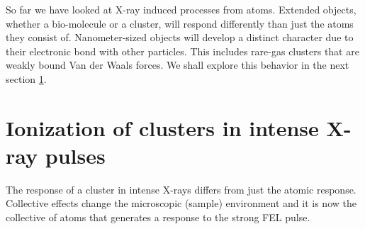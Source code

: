 So far we have looked at X-ray induced processes from atoms. Extended objects, whether a bio-molecule or a cluster, will respond differently than just the atoms they consist of. Nanometer-sized objects will develop a distinct character due to their electronic bond with other particles. This includes rare-gas clusters that are weakly bound Van der Waals forces. We shall explore this behavior in the next section \ref{sec:ionizatin-of-ext-obj}.
%
%
%
%
\section{Ionization of clusters in intense X-ray pulses}\label{sec:ionizatin-of-ext-obj}
The response of a cluster in intense X-rays differs from just the atomic response. Collective effects change the microscopic (sample) environment and it is now the collective of atoms that generates a response to the strong FEL pulse.
